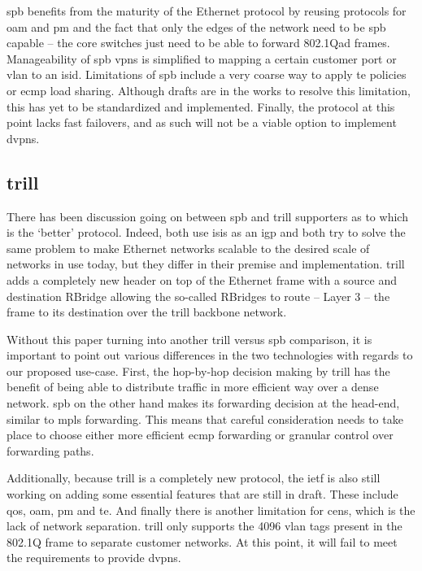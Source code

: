 \ac{spb} benefits from the maturity of the Ethernet protocol by reusing protocols for \ac{oam} and \ac{pm} and the fact that only the edges of the network need to be \ac{spb} capable -- the core switches just need to be able to forward 802.1Qad frames. Manageability of \ac{spb} \acp{vpn} is simplified to mapping a certain customer port or \ac{vlan} to an \ac{isid}. Limitations of \ac{spb} include a very coarse way to apply \ac{te} policies or \ac{ecmp} load sharing. Although drafts are in the works to resolve this limitation, this has yet to be standardized and implemented. Finally, the protocol at this point lacks fast failovers, and as such will not be a viable option to implement \acp{dvpn}.



\subsection{\acs{trill}} %
\label{sub:trill}
There has been discussion going on between \ac{spb} and \ac{trill} supporters as to which is the `better' protocol. Indeed, both use \ac{isis} as an \ac{igp} and both try to solve the same problem to make Ethernet networks scalable to the desired scale of networks in use today, but they differ in their premise and implementation. \ac{trill} adds a completely new header on top of  the Ethernet frame with a source and destination RBridge allowing the so-called RBridges to route -- Layer 3 -- the frame to its destination over the \ac{trill} backbone network.

Without this paper turning into another \ac{trill} versus \ac{spb} comparison, it is important to point out various differences in the two technologies with regards to our proposed use-case. First, the hop-by-hop decision making by \ac{trill} has the benefit of being able to distribute traffic in more efficient way over a dense network. \ac{spb} on the other hand makes its forwarding decision at the head-end, similar to \ac{mpls} forwarding. This means that careful consideration needs to take place to choose either more efficient \ac{ecmp} forwarding or granular control over forwarding paths. 

Additionally, because \ac{trill} is a completely new protocol, the \ac{ietf} is also still working on adding some essential features that are still in draft. These include \ac{qos}, \ac{oam}, \ac{pm} and \ac{te}. And finally there is another limitation for \acp{cen}, which is the lack of network separation. \ac{trill} only supports the 4096 \ac{vlan} tags present in the 802.1Q frame to separate customer networks. At this point, it will fail to meet the requirements to provide \acp{dvpn}.

